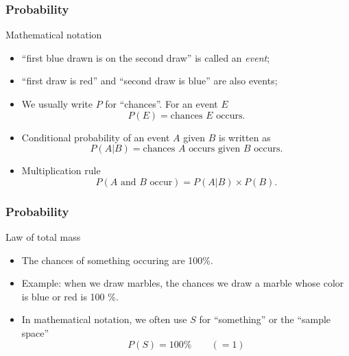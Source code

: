 \documentclass[handout]{beamer}
\begin{document}

   \begin{frame} \frametitle{Probability}

   \begin{block}
   {Mathematical notation}
   \begin{itemize}
   \item ``first blue drawn is on the second draw'' is called an {\em event};
   \item ``first draw is red'' and ``second draw is blue'' are also events;
     \item We usually write $P$ for ``chances''. For an event $E$
   $$
   P(E) = \text{chances $E$ occurs}.
   $$
   \item Conditional probability of an event $A$ given $B$ is written as
   $$
   P(A|B) = \text{chances $A$ occurs given $B$ occurs}.
   $$
   \item Multiplication rule
   $$
   P(\text{$A$ and $B$ occur}) = P(A|B) \times P(B).
   $$
   \end{itemize}
   \end{block}
   \end{frame}


   \begin{frame} \frametitle{Probability}

   \begin{block}
   {Law of total mass}
   \begin{itemize}
   \item    The chances of something occuring are 100\%.
   \item Example: when we draw marbles, the chances we draw a marble
   whose color is blue or red is 100 \%.
   \item In mathematical notation, we often use $S$ for ``something''
   or the ``sample space''
   $$
   P(S) = 100\% \qquad (= 1)
   $$
   \end{itemize}
   \end{block}
   \end{frame}

\end{document}
